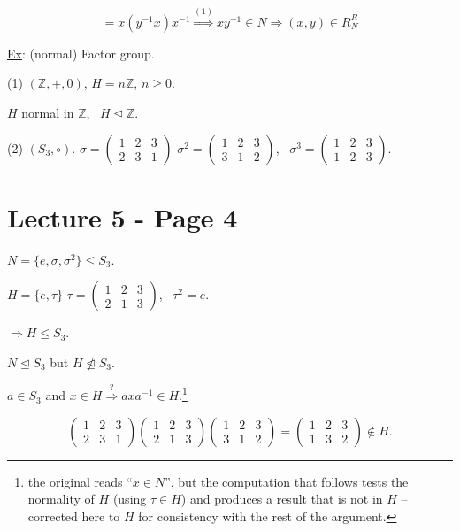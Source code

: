 \[
= x(y^{-1}x)x^{-1} \overset{(1)}{\Longrightarrow} xy^{-1}\in N \Rightarrow (x,y)\in R_N^R
\]

\bigskip
\noindent\underline{Ex}: (normal) Factor group.

\noindent (1) $(\mathbb{Z},+,0)$, $H=n\mathbb{Z}$, $n\geq 0$.

\noindent $H$ normal in $\mathbb{Z}$, \ $H\trianglelefteq\mathbb{Z}$.

\noindent (2) $(S_3,\circ)$. \quad $\sigma = \begin{pmatrix}1&2&3\\2&3&1\end{pmatrix}$ \quad $\sigma^2=\begin{pmatrix}1&2&3\\3&1&2\end{pmatrix}$, \ $\sigma^3=\begin{pmatrix}1&2&3\\1&2&3\end{pmatrix}$.



\section*{Lecture 5 - Page 4}

\noindent $N=\{e,\sigma,\sigma^2\} \leq S_3$.

\bigskip
\noindent $H=\{e,\tau\}$ \quad $\tau = \begin{pmatrix}1&2&3\\2&1&3\end{pmatrix}$, \ $\tau^2=e$.

\noindent $\Rightarrow H\leq S_3$.

\bigskip
\noindent $N \trianglelefteq S_3$ \quad but \quad $H\not\trianglelefteq S_3$.

\bigskip
\noindent $a\in S_3$ and $x\in H \overset{?}{\Rightarrow} axa^{-1}\in H$.\footnote{the original reads ``$x\in N$'', but the computation that follows tests the normality of $H$ (using $\tau\in H$) and produces a result that is not in $H$ -- corrected here to $H$ for consistency with the rest of the argument.}

\[
\begin{pmatrix}1&2&3\\2&3&1\end{pmatrix}\begin{pmatrix}1&2&3\\2&1&3\end{pmatrix}\begin{pmatrix}1&2&3\\3&1&2\end{pmatrix} = \begin{pmatrix}1&2&3\\1&3&2\end{pmatrix} \notin H.
\]

